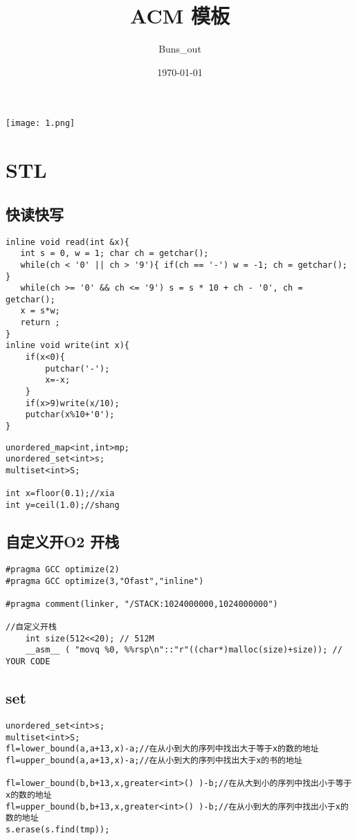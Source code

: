 \documentclass[12pt, a4paper, oneside]{ctexart}
\title{\fontsize{70}{30}\selectfont  ACM 模板}
\author{Buns\_out}
\date{\today}
\begin{document}
 



\maketitle
\thispagestyle{empty}
\centering
\texttt{[image: 1.png]}



\newpage
\tableofcontents 
\thispagestyle{empty}



\newpage 
\section{STL} 
\subsection{快读快写} 
\lstset{language=C++}
\begin{lstlisting}
inline void read(int &x){
   int s = 0, w = 1; char ch = getchar();
   while(ch < '0' || ch > '9'){ if(ch == '-') w = -1; ch = getchar(); }
   while(ch >= '0' && ch <= '9') s = s * 10 + ch - '0', ch = getchar();
   x = s*w;
   return ;
}
inline void write(int x){
    if(x<0){
    	putchar('-');
		x=-x;
	}
    if(x>9)write(x/10);
    putchar(x%10+'0');
}  
\end{lstlisting}
\begin{lstlisting}
unordered_map<int,int>mp;
unordered_set<int>s;
multiset<int>S;

int x=floor(0.1);//xia
int y=ceil(1.0);//shang
\end{lstlisting}

\newpage
\subsection{自定义开O2 开栈} 
\begin{lstlisting}
#pragma GCC optimize(2)
#pragma GCC optimize(3,"Ofast","inline")

#pragma comment(linker, "/STACK:1024000000,1024000000")

//自定义开栈
	int size(512<<20); // 512M
    __asm__ ( "movq %0, %%rsp\n"::"r"((char*)malloc(size)+size)); // YOUR CODE
\end{lstlisting}


\newpage
\subsection{set} 
\begin{lstlisting}
unordered_set<int>s;
multiset<int>S;
fl=lower_bound(a,a+13,x)-a;//在从小到大的序列中找出大于等于x的数的地址 
fl=upper_bound(a,a+13,x)-a;//在从小到大的序列中找出大于x的书的地址

fl=lower_bound(b,b+13,x,greater<int>() )-b;//在从大到小的序列中找出小于等于x的数的地址 
fl=upper_bound(b,b+13,x,greater<int>() )-b;//在从小到大的序列中找出小于x的数的地址 
s.erase(s.find(tmp));
\end{lstlisting}
\end{document}
